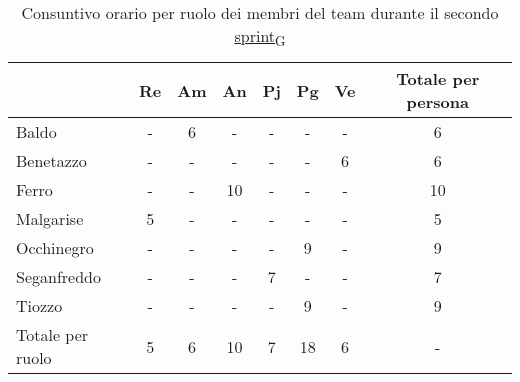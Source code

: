 \begin{table}[!h]
	\centering
	\begin{tabular}{ | l | c | c | c | c | c | c | c | }
		\hline
		\textbf{}        & \textbf{Re} & \textbf{Am} & \textbf{An} & \textbf{Pj} & \textbf{Pg} & \textbf{Ve} & \textbf{Totale per persona} \\
		\hline
		Baldo            & -           & 6           & -           & -           & -           & -           & 6                           \\
		Benetazzo        & -           & -           & -           & -           & -           & 6           & 6                           \\
		Ferro            & -           & -           & 10          & -           & -           & -           & 10                          \\
		Malgarise        & 5           & -           & -           & -           & -           & -           & 5                           \\
		Occhinegro       & -           & -           & -           & -           & 9           & -           & 9                           \\
		Seganfreddo      & -           & -           & -           & 7           & -           & -           & 7                           \\
		Tiozzo           & -           & -           & -           & -           & 9           & -           & 9                           \\
		\hline
		Totale per ruolo & 5           & 6           & 10          & 7           & 18          & 6           & -                           \\
		\hline
	\end{tabular}
	\caption{Consuntivo orario per ruolo dei membri del team durante il secondo \href{https://7last.github.io/docs/pb/documentazione-interna/glossario\#sprint}{sprint\textsubscript{G}}}
	
\end{table}

